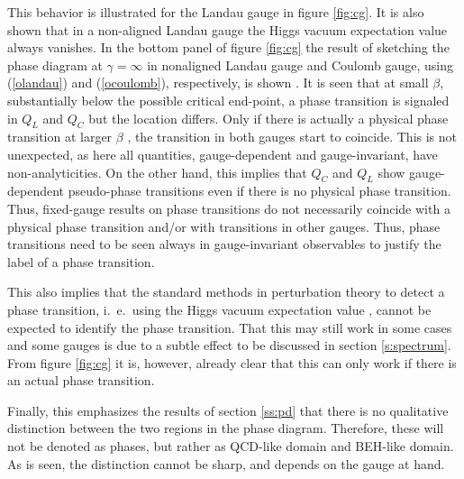 \documentclass[final,12pt]{article}
\newcommand*{\pref}[1]{(\ref{#1})}
\newcommand*{\1}{1\!\!\!\bot}
\begin{document}
This behavior is illustrated for the Landau gauge in figure \ref{fig:cg}. It is also shown that in a non-aligned Landau gauge the Higgs vacuum expectation value always vanishes. In the bottom panel of figure \ref{fig:cg} the result of sketching the phase diagram at $\gamma=\infty$ in nonaligned Landau gauge and Coulomb gauge, using \pref{olandau} and \pref{ocoulomb}, respectively, is shown \cite{Caudy:2007sf}. It is seen that at small $\beta$, substantially below the possible critical end-point, a phase transition is signaled in $Q_L$ and $Q_C$ but the location differs. Only if there is actually a physical phase transition at larger $\beta$ \cite{Bonati:2009pf,Bonati:2009yi}, the transition in both gauges start to coincide. This is not unexpected, as here all quantities, gauge-dependent and gauge-invariant, have non-analyticities. On the other hand, this implies that $Q_C$ and $Q_L$ show gauge-dependent pseudo-phase transitions even if there is no physical phase transition. Thus, fixed-gauge results on phase transitions do not necessarily coincide with a physical phase transition and/or with transitions in other gauges. Thus, phase transitions need to be seen always in gauge-invariant observables to justify the label of a phase transition.

This also implies that the standard methods in perturbation theory to detect a phase transition, i.\ e.\ using the Higgs vacuum expectation value \cite{Kapusta:2006pm}, cannot be expected to identify the phase transition. That this may still work in some cases and some gauges is due to a subtle effect to be discussed in section \ref{s:spectrum}. From figure \ref{fig:cg} it is, however, already clear that this can only work if there is an actual phase transition.

Finally, this emphasizes the results of section \ref{ss:pd} that there is no qualitative distinction between the two regions in the phase diagram. Therefore, these will not be denoted as phases, but rather as QCD-like domain and BEH-like domain. As is seen, the distinction cannot be sharp, and depends on the gauge at hand.
\end{document}

